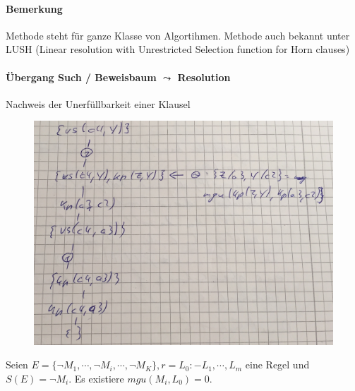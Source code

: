 \documentclass[12pt, a4paper]{article}
\begin{document}
\paragraph{Bemerkung} Methode steht für ganze Klasse von Algortihmen. Methode auch bekannt unter LUSH (Linear resolution with Unrestricted Selection function for Horn clauses) \\
\paragraph{Übergang Such / Beweisbaum $\leadsto$ Resolution}
Nachweis der Unerfüllbarkeit einer Klausel

\begin{figure}
\centering
\includegraphics[width=0.7\linewidth]{img/img9}
\caption{}
\label{fig:img9}
\end{figure}


Seien $E = \{ \lnot M_1, \cdots, \lnot M_i, \cdots, \lnot M_K \}, r = L_0 :- L_1, \cdots, L_m$ eine Regel und $S(E) = \lnot M_i$. Es existiere $mgu(M_i, L_0) = 0$.
\end{document}
